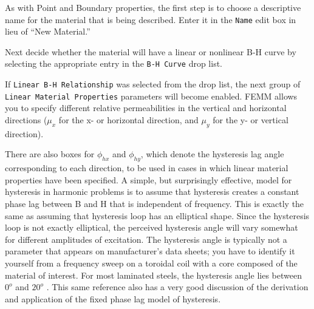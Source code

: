 \documentclass[12pt]{report}
\begin{document}
As with Point and Boundary properties, the first step is to choose
a descriptive name for the material that is being described.  Enter
it in the {\tt Name} edit box in lieu of ``New Material.''

Next decide whether the material will have a linear or nonlinear B-H curve
by selecting the appropriate entry in the {\tt B-H Curve} drop list.

If {\tt Linear B-H Relationship} was selected from the drop list,
the next group of {\tt Linear Material Properties} parameters will
become enabled. FEMM allows you to specify different relative
permeabilities in the vertical and horizontal directions ($\mu_x$
for the x- or horizontal direction, and $\mu_y$ for the y- or
vertical direction).

There are also boxes for $\phi_{hx}$ and $\phi_{hy}$, which denote
the hysteresis lag angle corresponding to each direction, to be
used in cases in which linear material properties have been
specified. A simple, but surprisingly effective, model for
hysteresis in harmonic problems is to assume that hysteresis
creates a constant phase lag between B and H that is independent of
frequency. This is exactly the same as assuming that hysteresis
loop has an elliptical shape. Since the hysteresis loop is not
exactly elliptical, the perceived hysteresis angle will vary
somewhat for different amplitudes of excitation. The hysteresis
angle is typically not a parameter that appears on manufacturer's
data sheets; you have to identify it yourself from a frequency
sweep on a toroidal coil with a core composed of the material of
interest. For most laminated steels, the hysteresis angle lies
between $0^o$ and $20^o$ \cite{stoll}. This same reference also has
a very good discussion of the derivation and application of the
fixed phase lag model of hysteresis.
\end{document}
